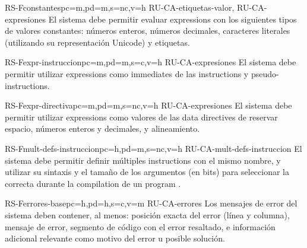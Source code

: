 \begin{softwareReq}{RS-F}{constantes}{pc=m,pd=m,s=nc,v=h}
    {RU-CA-etiquetas-valor, RU-CA-expresiones}
    El sistema debe permitir evaluar \glspl{expression} con los siguientes tipos
    de valores constantes: números enteros, números decimales, caracteres
    literales (utilizando su representación Unicode) y etiquetas.
\end{softwareReq}

\begin{softwareReq}{RS-F}{expr-instruccion}{pc=m,pd=m,s=c,v=h}
    {RU-CA-expresiones}
    El sistema debe permitir utilizar \glspl{expression} como \glspl{immediate}
    de las \glspl{instruction} y \glspl{pseudo-instruction}.
\end{softwareReq}

\begin{softwareReq}{RS-F}{expr-directiva}{pc=m,pd=m,s=nc,v=h}
    {RU-CA-expresiones}
    El sistema debe permitir utilizar \glspl{expression} como valores de las
    \glspl{data directive} de reservar espacio, números enteros y decimales, y
    alineamiento.
\end{softwareReq}

\begin{softwareReq}{RS-F}{mult-defs-instruccion}{pc=h,pd=m,s=nc,v=h}
    {RU-CA-mult-defs-instruccion}
    El sistema debe permitir definir múltiples \glspl{instruction} con el mismo
    nombre, y utilizar su sintaxis y el tamaño de los argumentos (en bits) para
    seleccionar la correcta durante la \gls{compilation} de un \gls{program}
    .
\end{softwareReq}

\begin{softwareReq}{RS-F}{errores-base}{pc=h,pd=h,s=c,v=m}
    {RU-CA-errores}
    Los mensajes de error del sistema deben contener, al menos: posición exacta
    del error (línea y columna), mensaje de error, segmento de código con el
    error resaltado, e información adicional relevante como motivo del error u
    posible solución.
\end{softwareReq}


